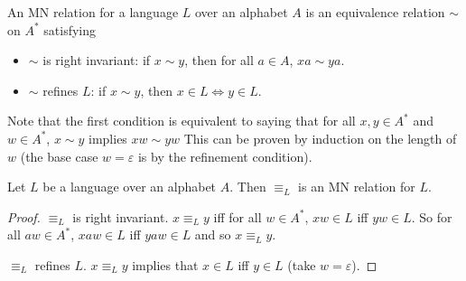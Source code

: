 \begin{definition*} \label{def:mn}
    An MN relation for a language $L$ over an alphabet $A$ is an equivalence
    relation $\sim$ on $A^*$ satisfying
    \begin{itemize}
        \item $\sim$ is right invariant: if $x \sim y$, then for all
        $a \in A$, $xa \sim ya$.
        \item $\sim$ refines $L$: if $x \sim y$, then $x \in L \iff y \in L$.
    \end{itemize}
\end{definition*}
Note that the first condition is equivalent to saying that for all
$x, y \in A^*$ and $w \in A^*$, $x \sim y$ implies $xw \sim yw$
This can be proven by induction on the length of $w$ (the base case
$w = \varepsilon$ is by the refinement condition).

\begin{proposition*} \label{thm:mn:canonical}
   Let $L$ be a language over an alphabet $A$.
    Then $\equiv_L$ is an MN relation for $L$.
\end{proposition*}
\begin{proof}
    $\equiv_L$ is right invariant.
    $x \equiv_L y$ iff for all $w \in A^*$, $xw \in L$ iff $yw \in L$.
    So for all $aw \in A^*$, $xaw \in L$ iff $yaw \in L$ and so
    $x \equiv_L y$.

    $\equiv_L$ refines $L$.
    $x \equiv_L y$ implies that $x \in L$ iff $y \in L$ (take
    $w = \varepsilon$).
\end{proof}

